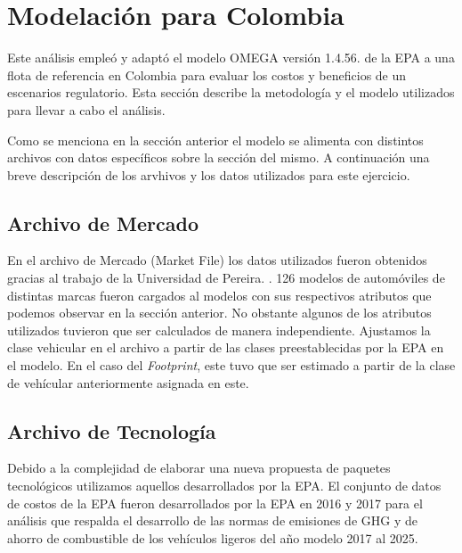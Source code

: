 \section{Modelación para Colombia}

Este análisis empleó y adaptó el modelo OMEGA versión 1.4.56. \cite{EPA_2016-B} de la EPA a una flota de referencia en Colombia para evaluar los costos y beneficios de un escenarios regulatorio. Esta sección describe la metodología y el modelo utilizados para llevar a cabo el análisis. 

Como se menciona en la sección anterior \label{sec:omega} el modelo se alimenta con distintos archivos con datos específicos sobre la sección del mismo. A continuación una breve descripción de los arvhivos y los datos utilizados para este ejercicio.

\subsection{Archivo de Mercado}

\begin{center}
\end{center}

En el archivo de Mercado (Market File) los datos utilizados fueron obtenidos gracias al trabajo de la Universidad de Pereira. \cite{Baseline_Pereira_2020}. 126 modelos de automóviles de distintas marcas fueron cargados al modelos con sus respectivos atributos que podemos observar en la sección anterior. No obstante algunos de los atributos utilizados tuvieron que ser calculados de manera independiente. Ajustamos la clase vehicular en el archivo a partir de las clases preestablecidas por la EPA en el modelo. En el caso del \textit{Footprint}, este tuvo que ser estimado a partir de la clase de vehícular anteriormente asignada en este. 

\subsection{Archivo de Tecnología}

\begin{center}
\end{center}

Debido a la complejidad de elaborar una nueva propuesta de paquetes tecnológicos utilizamos aquellos desarrollados por la EPA. El conjunto de datos de costos de la EPA fueron desarrollados por la EPA en 2016 y 2017 para el análisis que respalda el desarrollo de las normas de emisiones de GHG y de ahorro de combustible de los vehículos ligeros del año modelo 2017 al 2025.

